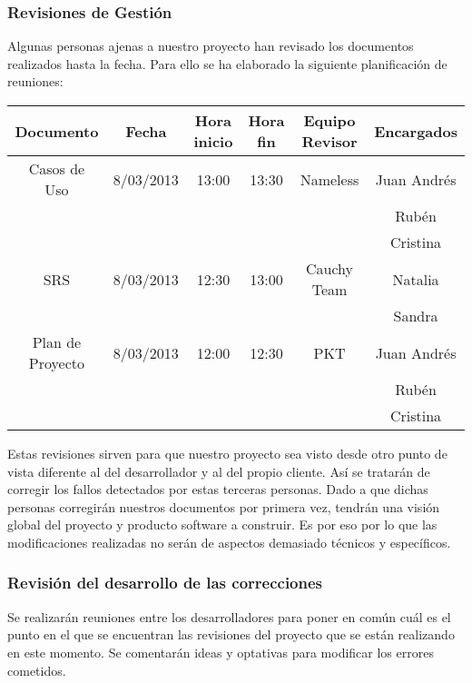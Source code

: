 \documentclass[11pt, a4paper, twoside, titlepage]{article}
\begin{document}
			\subsubsection{Revisiones de Gestión}
			Algunas personas ajenas a nuestro proyecto han revisado los documentos realizados hasta la fecha. Para ello se ha elaborado la siguiente planificación de reuniones: \\
			
			\begin{center}
				\begin{tabular}{| c | c | c | c | c | c |}
				\hline
				\bfseries Documento	& \bfseries Fecha & \bfseries Hora inicio & \bfseries Hora fin & \bfseries Equipo Revisor &  \bfseries Encargados \\ \hline
				Casos de Uso 		& 8/03/2013	& 13:00	& 13:30	& Nameless	& Juan Andrés	\\ 								&		&	&	&		& Rubén		\\
							&		&	&	&		& Cristina	\\ \hline
				SRS 			& 8/03/2013	& 12:30	& 13:00 & Cauchy Team 	& Natalia	\\
							&		&	&	&		& Sandra	\\ \hline
				Plan de Proyecto	& 8/03/2013	& 12:00 & 12:30 & PKT		& Juan Andrés	\\
							&		&	&	&		& Rubén		\\
							&		&	&	&		& Cristina	\\ \hline
				\end{tabular}
			\end{center}
			
			Estas revisiones sirven para que nuestro proyecto sea visto desde otro punto de vista diferente al del desarrollador y al del propio cliente. Así se tratarán de corregir los fallos detectados por estas terceras personas. Dado a que dichas personas corregirán nuestros documentos por primera vez, tendrán una visión global del proyecto y producto software a construir. Es por eso por lo que las modificaciones realizadas no serán de aspectos demasiado técnicos y específicos.

			\subsubsection{Revisión del desarrollo de las correcciones}
				Se realizarán reuniones entre los desarrolladores para poner en común cuál es el punto en el que se encuentran las revisiones del proyecto que se están realizando en este momento. Se comentarán ideas y optativas para modificar los errores cometidos.
		
\end{document}
